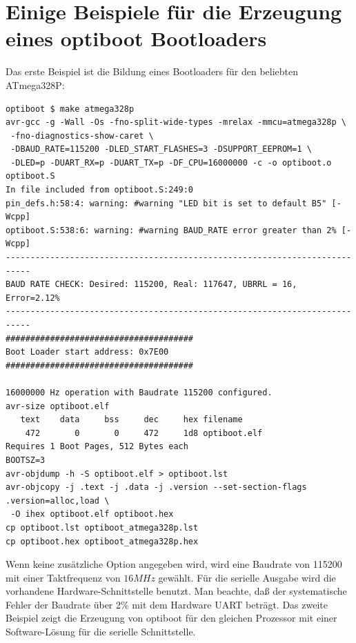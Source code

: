 \section{Einige Beispiele für die Erzeugung eines optiboot Bootloaders}

Das erste Beispiel ist die Bildung eines Bootloaders für den beliebten ATmega328P:

\begin{verbatim}
optiboot $ make atmega328p
avr-gcc -g -Wall -Os -fno-split-wide-types -mrelax -mmcu=atmega328p \
 -fno-diagnostics-show-caret \
 -DBAUD_RATE=115200 -DLED_START_FLASHES=3 -DSUPPORT_EEPROM=1 \
 -DLED=p -DUART_RX=p -DUART_TX=p -DF_CPU=16000000 -c -o optiboot.o optiboot.S
In file included from optiboot.S:249:0
pin_defs.h:58:4: warning: #warning "LED bit is set to default B5" [-Wcpp]
optiboot.S:538:6: warning: #warning BAUD_RATE error greater than 2% [-Wcpp]
---------------------------------------------------------------------------
BAUD RATE CHECK: Desired: 115200, Real: 117647, UBRRL = 16, Error=2.12%
---------------------------------------------------------------------------
######################################
Boot Loader start address: 0x7E00
######################################

16000000 Hz operation with Baudrate 115200 configured.
avr-size optiboot.elf
   text	   data	    bss	    dec	    hex	filename
    472	      0	      0	    472	    1d8	optiboot.elf
Requires 1 Boot Pages, 512 Bytes each
BOOTSZ=3
avr-objdump -h -S optiboot.elf > optiboot.lst
avr-objcopy -j .text -j .data -j .version --set-section-flags .version=alloc,load \
 -O ihex optiboot.elf optiboot.hex
cp optiboot.lst optiboot_atmega328p.lst
cp optiboot.hex optiboot_atmega328p.hex
\end{verbatim}

Wenn keine zusätzliche Option angegeben wird, wird eine Baudrate von 115200 mit einer Taktfrequenz von \(16 MHz\) gewählt.
Für die serielle Ausgabe wird die vorhandene Hardware-Schnittstelle benutzt. 
Man beachte, daß der systematische Fehler der Baudrate über 2\% mit dem Hardware UART beträgt.
Das zweite Beispiel zeigt die Erzeugung von optiboot für den gleichen Prozessor mit einer Software-Lösung
für die serielle Schnittstelle.

